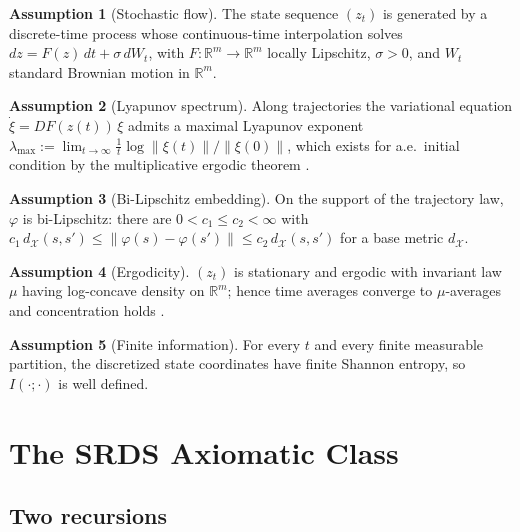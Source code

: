 \documentclass[11pt]{article}
\theoremstyle{plain}
\theoremstyle{definition}
\newtheorem{assumption}{Assumption}
\theoremstyle{remark}
\newcommand{\R}{\mathbb{R}}
\newcommand{\norm}[1]{\left\lVert#1\right\rVert}
\begin{document}
\begin{assumption}[Stochastic flow]\label{R:flow}
The state sequence $(z_t)$ is generated by a discrete-time process whose continuous-time interpolation solves $dz=F(z)\,dt+\sigma\,dW_t$, with $F:\R^m\to\R^m$ locally Lipschitz, $\sigma>0$, and $W_t$ standard Brownian motion in $\R^m$.
\end{assumption}

\begin{assumption}[Lyapunov spectrum]\label{R:lyap}
Along trajectories the variational equation $\dot\xi=DF(z(t))\,\xi$ admits a maximal Lyapunov exponent $\lambda_{\max}:=\lim_{t\to\infty}\tfrac1t\log\norm{\xi(t)}/\norm{\xi(0)}$, which exists for a.e.\ initial condition by the multiplicative ergodic theorem \citep{oseledets1968}.
\end{assumption}

\begin{assumption}[Bi-Lipschitz embedding]\label{R:embed}
On the support of the trajectory law, $\varphi$ is bi-Lipschitz: there are $0<c_1\le c_2<\infty$ with $c_1\,d_{\mathcal X}(s,s')\le\norm{\varphi(s)-\varphi(s')}\le c_2\,d_{\mathcal X}(s,s')$ for a base metric $d_{\mathcal X}$.
\end{assumption}

\begin{assumption}[Ergodicity]\label{R:ergodic}
$(z_t)$ is stationary and ergodic with invariant law $\mu$ having log-concave density on $\R^m$; hence time averages converge to $\mu$-averages \citep{birkhoff1931} and concentration holds \citep{bobkov2003}.
\end{assumption}

\begin{assumption}[Finite information]\label{R:mi}
For every $t$ and every finite measurable partition, the discretized state coordinates have finite Shannon entropy, so $I(\cdot;\cdot)$ is well defined.
\end{assumption}

\section{The SRDS Axiomatic Class}\label{sec:axioms}

\subsection{Two recursions}
\end{document}
